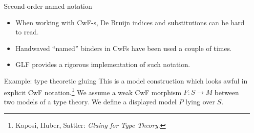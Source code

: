 \documentclass[dvipsnames,aspectratio=169]{beamer}
\newcommand{\ms}[1]{\mathsf{#1}}
\newcommand{\Con}{\mathsf{Con}}
\newcommand{\Sub}{\mathsf{Sub}}
\newcommand{\Ty}{\mathsf{Ty}}
\newcommand{\ext}{\triangleright}
\begin{document}
\begin{frame}{Second-order named notation}
  \begin{itemize}
  \item When working with CwF-s, De Bruijn indices and substitutions
        can be hard to read.
  \item Handwaved ``named'' binders in CwFs have been used a couple of times.
  \item GLF provides a rigorous implementation of such notation.
  \end{itemize}
\end{frame}

\begin{frame}{Example: type theoretic gluing}
This is a model construction which looks awful in explicit CwF notation.\footnote{Kaposi, Huber,
Sattler: \emph{Gluing for Type Theory}.} We assume a weak CwF morphism $F : S \to M$ between two models of a type theory. We define a displayed model $P$ lying over $S$.






\end{frame}














\end{document}
